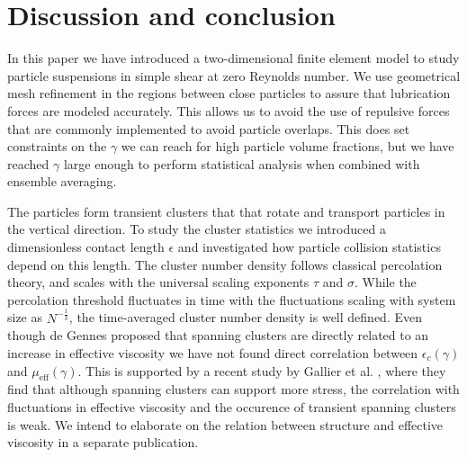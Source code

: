 \documentclass[aps,pre,twocolumn,letterpaper,floatfix,showpacs]{revtex4}
\begin{document}
\section{Discussion and conclusion} \label{section:discussion}
In this paper we have introduced a two-dimensional finite element model to study particle suspensions in simple shear at zero Reynolds number. We use geometrical mesh refinement in the regions between close particles to assure that lubrication forces are modeled accurately. This allows us to avoid the use of repulsive forces that are commonly implemented to avoid particle overlaps. This does set constraints on the $\gamma$ we can reach for high particle volume fractions, but we have reached $\gamma$ large enough to perform statistical analysis when combined with ensemble averaging. 

The particles form transient clusters that that rotate and transport particles in the vertical direction. To study the cluster statistics we introduced a dimensionless contact length $\epsilon$ and investigated how particle collision statistics depend on this length.  The cluster number density follows classical percolation theory, and scales with the universal scaling exponents $\tau$ and $\sigma$. While the percolation threshold fluctuates in time with the fluctuations scaling with system size as $N^{-\frac{1}{3}}$, the time-averaged cluster number density is well defined. Even though de Gennes proposed that spanning clusters are directly related to an increase in effective viscosity we have not found direct correlation between $\epsilon_c(\gamma)$ and $\mu_\text{eff}(\gamma)$. This is supported by a recent study by Gallier et al. \cite{gallier2015percolation}, where they find that although spanning clusters can support more stress, the correlation with fluctuations in effective viscosity and the occurence of transient spanning clusters is weak. We intend to elaborate on the relation between structure and effective viscosity in a separate publication.
\end{document}
